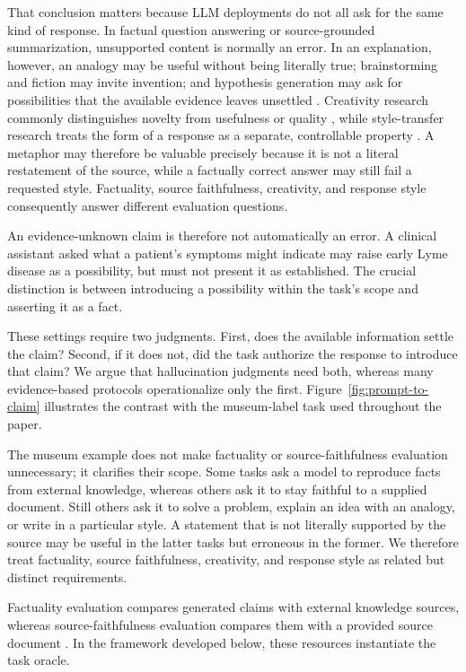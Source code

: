 \documentclass{clv2025}
\begin{document}
That conclusion matters because LLM deployments do not all ask for the same kind
of response. In factual question answering or source-grounded summarization,
unsupported content is normally an error. In an explanation, however, an
analogy may be useful without being literally true; brainstorming and fiction
may invite invention; and hypothesis generation may ask for possibilities that
the available evidence leaves unsettled
\citep{franceschelli_creativity_2024,jiang_survey_2024,rick_supermind_2023}.
Creativity research commonly distinguishes novelty from usefulness or quality
\citep{runco_standard_2012,diedrich_are_2015}, while style-transfer research
treats the form of a response as a separate, controllable property
\citep{kang_style_2021}. A metaphor may therefore be valuable precisely because
it is not a literal restatement of the source, while a factually correct answer
may still fail a requested style. Factuality, source faithfulness, creativity,
and response style consequently answer different evaluation questions.

An evidence-unknown claim is therefore not automatically an error. A clinical
assistant asked what a patient's symptoms might indicate may raise early Lyme
disease as a possibility, but must not present it as established. The crucial
distinction is between introducing a possibility within the task's scope and
asserting it as a fact.

These settings require two judgments. First, does the available information
settle the claim? Second, if it does not, did the task authorize the response to
introduce that claim? We argue that hallucination judgments need both, whereas
many evidence-based protocols operationalize only the first.
Figure~\ref{fig:prompt-to-claim} illustrates the contrast with the museum-label
task used throughout the paper.



The museum example does not make factuality or source-faithfulness evaluation
unnecessary; it clarifies their scope. Some tasks ask a model to reproduce facts
from external knowledge, whereas others ask it to stay faithful to a supplied
document. Still others ask it to solve a problem, explain an idea with an
analogy, or write in a particular style. A statement that is not literally
supported by the source may be useful in the latter tasks but erroneous in the
former. We therefore treat factuality, source faithfulness, creativity, and
response style as related but distinct requirements.

Factuality evaluation compares generated claims with external knowledge
sources, whereas source-faithfulness evaluation compares them with a provided
source document
\citep{maynez_faithfulness_2020,kryscinski_evaluating_2020,min_factscore_2023}.
In the framework developed below, these resources instantiate the task oracle.
\end{document}
